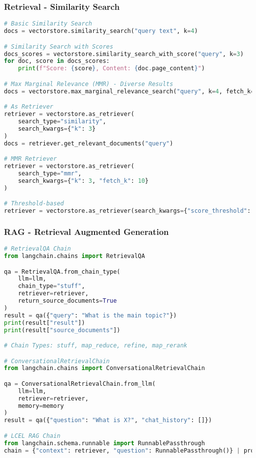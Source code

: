 \begin{frame}[fragile]\frametitle{Retrieval - Similarity Search}
\begin{lstlisting}[language=python,basicstyle=\tiny]
# Basic Similarity Search
docs = vectorstore.similarity_search("query text", k=4)

# Similarity Search with Scores
docs_scores = vectorstore.similarity_search_with_score("query", k=3)
for doc, score in docs_scores:
    print(f"Score: {score}, Content: {doc.page_content}")

# Max Marginal Relevance (MMR) - Diverse Results
docs = vectorstore.max_marginal_relevance_search("query", k=4, fetch_k=20)

# As Retriever
retriever = vectorstore.as_retriever(
    search_type="similarity",
    search_kwargs={"k": 3}
)
docs = retriever.get_relevant_documents("query")

# MMR Retriever
retriever = vectorstore.as_retriever(
    search_type="mmr",
    search_kwargs={"k": 3, "fetch_k": 10}
)

# Threshold-based
retriever = vectorstore.as_retriever(search_kwargs={"score_threshold": 0.5})
\end{lstlisting}
\end{frame}

\begin{frame}[fragile]\frametitle{RAG - Retrieval Augmented Generation}
\begin{lstlisting}[language=python,basicstyle=\tiny]
# RetrievalQA Chain
from langchain.chains import RetrievalQA

qa = RetrievalQA.from_chain_type(
    llm=llm,
    chain_type="stuff",
    retriever=retriever,
    return_source_documents=True
)
result = qa({"query": "What is the main topic?"})
print(result["result"])
print(result["source_documents"])

# Chain Types: stuff, map_reduce, refine, map_rerank

# ConversationalRetrievalChain
from langchain.chains import ConversationalRetrievalChain

qa = ConversationalRetrievalChain.from_llm(
    llm=llm,
    retriever=retriever,
    memory=memory
)
result = qa({"question": "What is X?", "chat_history": []})

# LCEL RAG Chain
from langchain.schema.runnable import RunnablePassthrough
chain = {"context": retriever, "question": RunnablePassthrough()} | prompt | llm
\end{lstlisting}
\end{frame}

